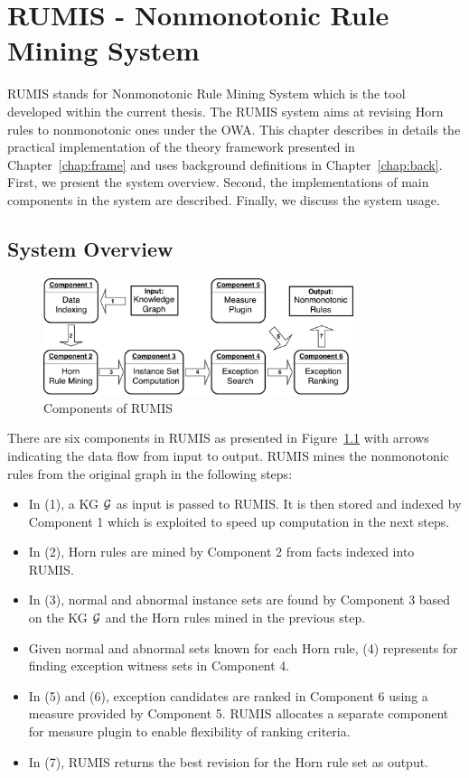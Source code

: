 \chapter{RUMIS - Nonmonotonic Rule Mining System}\label{chap:system}
\label{chap:system}

RUMIS stands for Nonmonotonic Rule Mining System which is the tool developed within the current thesis. The RUMIS system aims at revising Horn rules to nonmonotonic ones under the OWA. This chapter describes in details the practical implementation of the theory framework presented in Chapter~\ref{chap:frame} and uses background definitions in Chapter~\ref{chap:back}. First, we present the system overview. Second, the implementations of main components in the system are described. Finally, we discuss the system usage.

\section{System Overview}
\label{sec:overview}

\begin{figure}[h]
\centering
\includegraphics[width=0.81\textwidth]{figures/system_overview}
\caption{Components of RUMIS}
\label{system_overview}
\end{figure}

There are six components in RUMIS as presented in Figure~\ref{system_overview} with arrows indicating the data flow from input to output. RUMIS mines the nonmonotonic rules from the original graph in the following steps:

\begin{itemize}
\item In (1), a KG $\mathcal{G}$ as input is passed to RUMIS. It is then stored and indexed by Component 1 which is exploited to speed up computation in the next steps.
\item In (2), Horn rules are mined by Component 2 from facts indexed into RUMIS.
\item In (3), normal and abnormal instance sets are found by Component 3 based on the KG $\mathcal{G}$ and the Horn rules mined in the previous step.
\item Given normal and abnormal sets known for each Horn rule, (4) represents for finding exception witness sets in Component 4.
\item In (5) and (6), exception candidates are ranked in Component 6 using a measure provided by Component 5. RUMIS allocates a separate component for measure plugin to enable flexibility of ranking criteria.
\item In (7), RUMIS returns the best revision for the Horn rule set as output.
\end{itemize}

